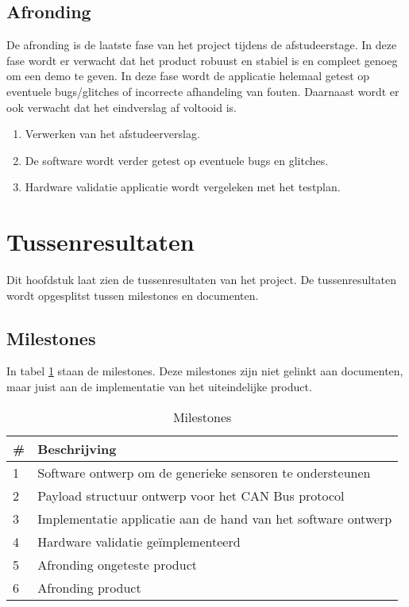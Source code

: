 \newpage
\subsection{Afronding}
De afronding is de laatste fase van het project tijdens de afstudeerstage. In deze fase wordt er verwacht dat het product robuust en stabiel is en compleet genoeg om een demo te geven. In deze fase wordt de applicatie helemaal getest op eventuele bugs/glitches of incorrecte afhandeling van fouten. Daarnaast wordt er ook verwacht dat het eindverslag af voltooid is.
\begin{enumerate}
	\item Verwerken van het afstudeerverslag.
	\item De software wordt verder getest op eventuele bugs en glitches.
	\item Hardware validatie applicatie wordt vergeleken met het testplan.
\end{enumerate}


\section{Tussenresultaten}
Dit hoofdstuk laat zien de tussenresultaten van het project. De tussenresultaten wordt opgesplitst tussen milestones en documenten.

\subsection{Milestones}
In tabel \ref{tab:milestones} staan de milestones. Deze milestones zijn niet gelinkt aan documenten, maar juist aan de implementatie van het uiteindelijke product.
\begin{table}[h!]
		\caption{Milestones}
		\begin{tabular}{p{1cm}p{14cm}}
		\toprule
		\textbf{\#} & \textbf{Beschrijving} \\ \midrule
		1 & Software ontwerp om de generieke sensoren te ondersteunen      \\
		2 & Payload structuur ontwerp voor het CAN Bus protocol      \\
		3 & Implementatie applicatie aan de hand van het software ontwerp					\\
		4 & Hardware validatie geïmplementeerd		\\
		5 & Afronding ongeteste product \\
		6 & Afronding product              \\ \bottomrule
		\end{tabular}

	\label{tab:milestones}
\end{table}

